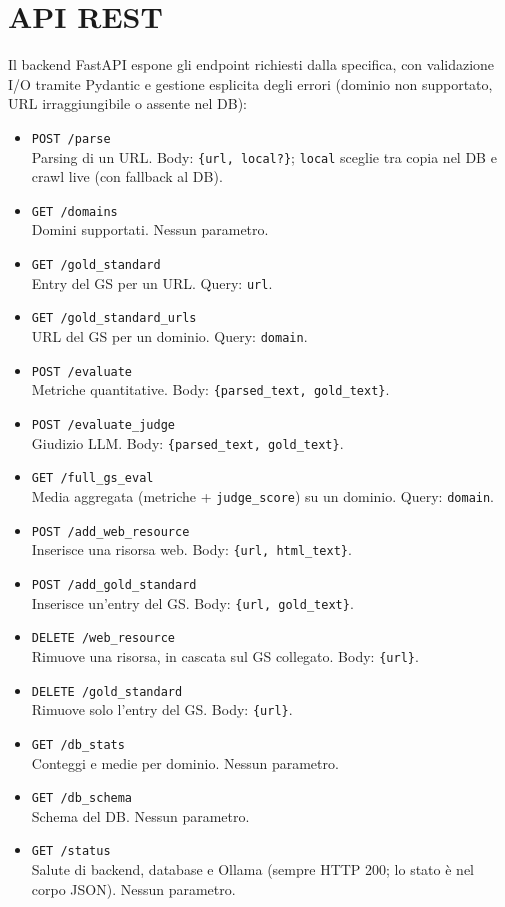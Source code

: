 \documentclass[11pt]{article}
\begin{document}
\section{API REST}

Il backend FastAPI espone gli endpoint richiesti dalla specifica, con validazione I/O tramite Pydantic e gestione esplicita degli errori (dominio non supportato, URL irraggiungibile o assente nel DB):

\begin{itemize}
  \item \texttt{POST /parse}\\
  Parsing di un URL. Body: \texttt{\{url, local?\}}; \texttt{local} sceglie tra copia nel DB e crawl live (con fallback al DB).
  \item \texttt{GET /domains}\\
  Domini supportati. Nessun parametro.
  \item \texttt{GET /gold\_standard}\\
  Entry del GS per un URL. Query: \texttt{url}.
  \item \texttt{GET /gold\_standard\_urls}\\
  URL del GS per un dominio. Query: \texttt{domain}.
  \item \texttt{POST /evaluate}\\
  Metriche quantitative. Body: \texttt{\{parsed\_text, gold\_text\}}.
  \item \texttt{POST /evaluate\_judge}\\
  Giudizio LLM. Body: \texttt{\{parsed\_text, gold\_text\}}.
  \item \texttt{GET /full\_gs\_eval}\\
  Media aggregata (metriche + \texttt{judge\_score}) su un dominio. Query: \texttt{domain}.
  \item \texttt{POST /add\_web\_resource}\\
  Inserisce una risorsa web. Body: \texttt{\{url, html\_text\}}.
  \item \texttt{POST /add\_gold\_standard}\\
  Inserisce un'entry del GS. Body: \texttt{\{url, gold\_text\}}.
  \item \texttt{DELETE /web\_resource}\\
  Rimuove una risorsa, in cascata sul GS collegato. Body: \texttt{\{url\}}.
  \item \texttt{DELETE /gold\_standard}\\
  Rimuove solo l'entry del GS. Body: \texttt{\{url\}}.
  \item \texttt{GET /db\_stats}\\
  Conteggi e medie per dominio. Nessun parametro.
  \item \texttt{GET /db\_schema}\\
  Schema del DB. Nessun parametro.
  \item \texttt{GET /status}\\
  Salute di backend, database e Ollama (sempre HTTP 200; lo stato è nel corpo JSON). Nessun parametro.
\end{itemize}
\end{document}
